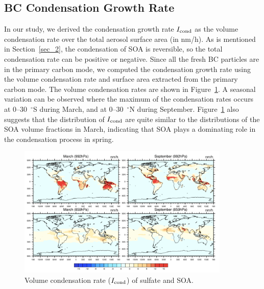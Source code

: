 \documentclass[12pt, fullpage]{uiucthesis2009_2}
\begin{document}
	\subsection{BC Condensation Growth Rate}\label{sec_3}		
	In our study, we derived the condensation growth rate $I_{\rm cond}$ as the volume condensation rate over the total aerosol surface area (in nm/h). As is mentioned in Section~\ref{sec_2}, the condensation of SOA is reversible, so the total condensation rate can be positive or negative. Since all the fresh BC particles are in the primary carbon mode, we computed the condensation growth rate using the volume condensation rate and surface area extracted from the primary carbon mode. The volume condensation rates are shown in Figure~\ref{fig_p24}. A seasonal variation can be observed where the maximum of the condensation rates occurs at 0--30~$^\circ$S during March, and at 0--30~$^\circ$N during September. Figure~\ref{fig_p24} also suggests that the distribution of $I_{\rm cond}$ are quite similar to the distributions of the SOA volume fractions in March, indicating that SOA plays a dominating role in the condensation process in spring. 
	\begin{figure}[h] 
		\begin{center}
			\includegraphics[width = 0.9\textwidth]{Figure24}
			\caption[Volume condensation rate ($I_{\rm cond}$) of sulfate and SOA]{\label{fig_p24} Volume condensation rate ($I_{\rm cond}$) of sulfate and SOA.}
		\end{center}
	\end{figure}
	
		
\end{document}
